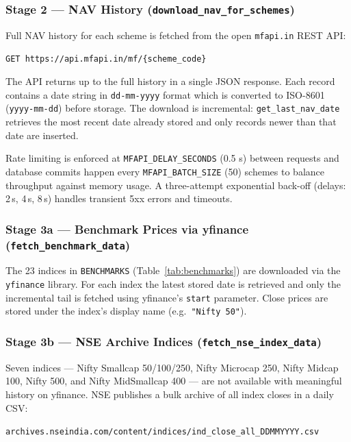 \documentclass[12pt, a4paper]{article}
\begin{document}
\subsubsection{Stage 2 — NAV History (\texttt{download\_nav\_for\_schemes})}

Full NAV history for each scheme is fetched from the open \texttt{mfapi.in}
REST API:

\begin{center}
\texttt{GET https://api.mfapi.in/mf/\{scheme\_code\}}
\end{center}

The API returns up to the full history in a single JSON response.  Each record
contains a date string in \texttt{dd-mm-yyyy} format which is converted to
ISO-8601 (\texttt{yyyy-mm-dd}) before storage.  The download is incremental:
\texttt{get\_last\_nav\_date} retrieves the most recent date already stored and
only records newer than that date are inserted.

Rate limiting is enforced at \texttt{MFAPI\_DELAY\_SECONDS} (0.5 s) between
requests and database commits happen every \texttt{MFAPI\_BATCH\_SIZE} (50)
schemes to balance throughput against memory usage.  A three-attempt
exponential back-off (delays: 2\,s, 4\,s, 8\,s) handles transient 5xx
errors and timeouts.

\subsubsection{Stage 3a — Benchmark Prices via yfinance
  (\texttt{fetch\_benchmark\_data})}

The 23 indices in \texttt{BENCHMARKS} (Table~\ref{tab:benchmarks}) are
downloaded via the \texttt{yfinance} library.  For each index the latest stored
date is retrieved and only the incremental tail is fetched using yfinance's
\texttt{start} parameter.  Close prices are stored under the index's display
name (e.g.\ \texttt{"Nifty 50"}).

\subsubsection{Stage 3b — NSE Archive Indices (\texttt{fetch\_nse\_index\_data})}

Seven indices — Nifty Smallcap 50/100/250, Nifty Microcap 250, Nifty Midcap
100, Nifty 500, and Nifty MidSmallcap 400 — are not available with meaningful
history on yfinance.  NSE publishes a bulk archive of all index closes in a
daily CSV:

\begin{center}
\texttt{archives.nseindia.com/content/indices/ind\_close\_all\_DDMMYYYY.csv}
\end{center}
\end{document}
